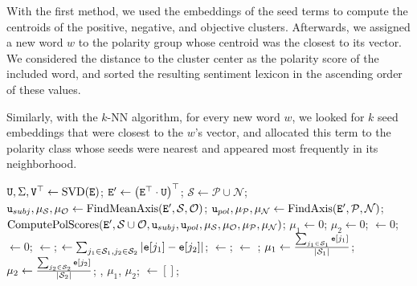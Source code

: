 With the first method, we used the embeddings of the seed terms to
compute the centroids of the positive, negative, and objective
clusters.  Afterwards, we assigned a new word $w$ to the polarity
group whose centroid was the closest to its vector.  We considered the
distance to the cluster center as the polarity score of the included
word, and sorted the resulting sentiment lexicon in the ascending
order of these values.

Similarly, with the $k$-NN algorithm, for every new word $w$, we
looked for $k$ seed embeddings that were closest to the $w$'s vector,
and allocated this term to the polarity class whose seeds were nearest
and appeared most frequently in its neighborhood.

\begin{algorithm}
  \begin{algorithmic}[1]
    \Statex{}
    \Statex{}
    \State $\texttt{U}, \Sigma, \texttt{V}^\top\gets\textrm{SVD}(\texttt{E})$;
    \State $\texttt{E}'\gets\left(\texttt{E}^\top\cdot \texttt{U}\right)^\top$;
    \State $\mathcal{S}\gets\mathcal{P}\cup\mathcal{N}$;
    \State $\texttt{u}_{subj}, \mu_{\mathcal{S}}, \mu_{\mathcal{O}}\gets\textrm{FindMeanAxis}(\texttt{E}', \mathcal{S}, \mathcal{O})$;
    \State $\texttt{u}_{pol}, \mu_{\mathcal{P}}, \mu_{\mathcal{N}}\gets\textrm{FindAxis}(\texttt{E}', \mathcal{P}, \mathcal{N})$;
    \State\Return $\func{ComputePolScores}(\vars{E}', \mathcal{S}\cup\mathcal{O},%
    \vars{u}_{subj}, \vars{u}_{pol}, \mu_{\mathcal{S}}, \mu_{\mathcal{O}},%
    \mu_{\mathcal{P}}, \mu_{\mathcal{N}})$;
    \EndFunction
    \Statex
    \State $\mu_1\gets 0$; $\mu_2\gets 0$;  $\gets 0$;  $\gets 0$;
    \State {} $\gets$;
    \State {} $\gets\sum_{j_1\in\mathcal{S}_1,j_2\in\mathcal{S}_2}\left|\texttt{e}[j_1] - \texttt{e}[j_2]\right|$;
    \State {} $\gets$;  $\gets$ ;
    \State $\mu_1\gets\frac{\sum_{j_1\in\mathcal{S}_1}\texttt{e}[j_1]}{|\mathcal{S}_1|}$; $\mu_2\gets\frac{\sum_{j_2\in\mathcal{S}_2}\texttt{e}[j_2]}{|\mathcal{S}_2|}$;
    \EndIf
    \EndFor
    \State\Return{}, $\mu_1$, $\mu_2$;
    \EndFunction
    \Statex
    \State{} $\gets []$;


\end{algorithmic}
\end{algorithm}
